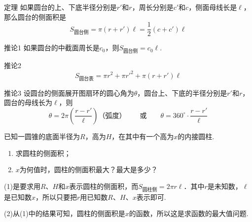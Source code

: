 \begin{thm}
    {定理} 如果圆台的上、下底半径分别是$r'$和$r$，周长分别是$c'$和$c$，侧面母线长是$\ell$，那么圆台的侧面积是
\[S_{\text{圆台侧}}=\pi(r+r')\ell=\frac{1}{2}(c+c')\ell\]
\end{thm}


\begin{thm}
    {推论1} 如果圆台的中截面周长是$c_0$，则$S_{\text{圆台侧}}=c_0\ell$.
\end{thm}


\begin{thm}
    {推论2} $$S_{\text{圆台表}}=\pi r^2+\pi {r'}^2+\pi(r+r')\ell$$
\end{thm}

\begin{thm}
    {推论3} 设圆台的侧面展开图扇环的圆心角为$\theta$，圆台上、下底的半径分别是$r'$和$r$，圆台的母线长为$\ell$，则
\[\theta=2\pi\left(\frac{r-r'}{\ell}\right)\text{（弧度）}\qquad \text{或}\qquad \theta=360^{\circ}\cdot \frac{r-r'}{\ell}\]
\end{thm}

\begin{example}
    已知一圆锥的底面半径为$R$，高为$H$，在其中有一个高为$x$的内接圆柱.
\begin{enumerate}[(1)]
    \item 求圆柱的侧面积；
    \item $x$为何值时，圆柱的侧面积最大？最大是多少？
\end{enumerate}
\end{example}

\begin{analyze}
(1)是要求用$R$、$H$和$x$表示圆柱的侧面积，而$S_{\text{圆柱侧}}=2\pi r\ell$．其中$r$是未知数，$\ell$是已知数$x$，所以只要把$r$用已知数$R$、$H$、$x$表示即可.

(2)从(1)中的结果可知，圆柱的侧面积是$x$的函数，所以这是求函数的最大值问题.
\end{analyze}

